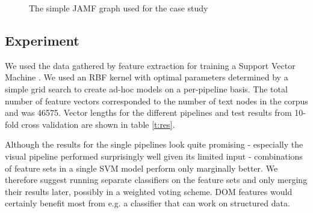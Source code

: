 \begin{figure}[h]
\centering
{}
\caption{
\label{f:jamfgraph}
	The simple JAMF graph used for the case study}
\end{figure}

\subsection{Experiment}

We used the data gathered by feature extraction for training a Support Vector Machine \cite{libsvm}.
We used an RBF kernel with optimal parameters determined by a simple grid search to create ad-hoc models on a per-pipeline basis.
The total number of feature vectors corresponded to the number of text nodes in the corpus and was 46575.
Vector lengths for the different pipelines and test results from 10-fold cross validation are shown in table \ref{t:res}.

Although the results for the single pipelines look quite promising - especially the visual pipeline performed surprisingly well given its limited input - combinations of feature sets in a single SVM model perform only marginally better.
We therefore suggest running separate classifiers on the feature sets and only merging their results later, possibly in a weighted voting scheme.
DOM features would certainly benefit most from e.g. a classifier that can work on structured data.

